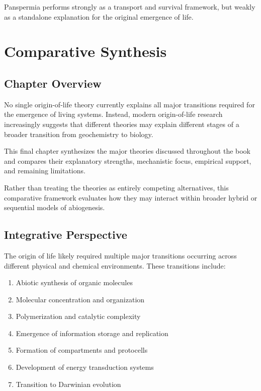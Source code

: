 \documentclass[
  oneside]{book}
\providecommand{\tightlist}{%
  \setlength{\itemsep}{0pt}\setlength{\parskip}{0pt}}
\begin{document}
Panspermia performs strongly as a transport and survival framework, but weakly as a standalone explanation for the original emergence of life.

\chapter{Comparative Synthesis}\label{comparative-synthesis}

\section{Chapter Overview}\label{chapter-overview-8}

No single origin-of-life theory currently explains all major transitions required for the emergence of living systems. Instead, modern origin-of-life research increasingly suggests that different theories may explain different stages of a broader transition from geochemistry to biology.

This final chapter synthesizes the major theories discussed throughout the book and compares their explanatory strengths, mechanistic focus, empirical support, and remaining limitations.

Rather than treating the theories as entirely competing alternatives, this comparative framework evaluates how they may interact within broader hybrid or sequential models of abiogenesis.

\section{Integrative Perspective}\label{integrative-perspective}

The origin of life likely required multiple major transitions occurring across different physical and chemical environments. These transitions include:

\begin{enumerate}
\def\labelenumi{\arabic{enumi}.}
\tightlist
\item
  Abiotic synthesis of organic molecules
\item
  Molecular concentration and organization
\item
  Polymerization and catalytic complexity
\item
  Emergence of information storage and replication
\item
  Formation of compartments and protocells
\item
  Development of energy transduction systems
\item
  Transition to Darwinian evolution
\end{enumerate}
\end{document}
